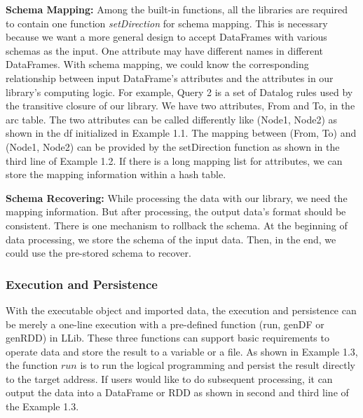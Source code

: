 \textbf{Schema Mapping: }Among the built-in functions,  all the libraries are required to contain one function \textit{setDirection} for schema mapping. This is necessary because we want a more general design to accept   DataFrames with various schemas as the input.  
One attribute may have different names in different DataFrames. With schema mapping, we could know the corresponding relationship between input DataFrame's attributes and the attributes in our library's computing logic.
For example, Query 2 is a set of Datalog rules used by the transitive closure of our library. We have two attributes,  From and To, in the arc table. The two attributes can be called differently like (Node1, Node2) as shown in the df initialized in Example 1.1. The mapping between (From, To) and (Node1, Node2) can be provided by the setDirection function as shown in the third line of Example 1.2. If there is a long mapping list for attributes, we can store the mapping information within a hash table.


\textbf{Schema Recovering:} While processing the data with our library, we need the mapping information. But after processing, the output data's format should be consistent. There is one mechanism to rollback the schema. At the beginning of data processing, we store the schema of the input data. Then, in the end, we could use the pre-stored schema to recover. 




\subsubsection{Execution and Persistence}
With the executable object and imported data, the execution and persistence can be merely a one-line execution with a pre-defined function (run, genDF or genRDD) in LLib. These three functions can support basic requirements to operate data and store the result to a variable or a file. As shown in Example 1.3, the function $run$ is to run the logical programming and persist the result directly to the target address. If users would like to do subsequent processing, it can output the data into a DataFrame or RDD as shown in  second and third line of the Example 1.3. 

